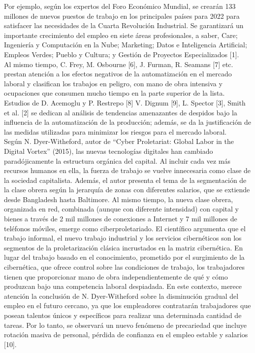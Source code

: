 Por ejemplo, según los expertos del Foro Económico Mundial, se crearán 133 millones de nuevos puestos de trabajo en los principales países para 2022 para satisfacer las necesidades de la Cuarta Revolución Industrial. Se garantizará un importante crecimiento del empleo en siete áreas profesionales, a saber, Care; Ingeniería y Computación en la Nube; Marketing; Datos e Inteligencia Artificial; Empleos Verdes; Pueblo y Cultura; y Gestión de Proyectos Especializados [1].\\

Al mismo tiempo, C. Frey, M. Osbourne [6], J. Furman, R. Seamans [7] etc. prestan atención a los efectos negativos de la automatización en el mercado laboral y clasifican los trabajos en peligro, con mano de obra intensiva y ocupaciones que consumen mucho tiempo en la parte superior de la lista. Estudios de D. Acemoglu y P. Restrepo [8] V. Dignum [9], L. Spector [3], Smith et al. [2] se dedican al análisis de tendencias amenazantes de despidos bajo la influencia de la automatización de la producción; además, se da la justificación de las medidas utilizadas para minimizar los riesgos para el mercado laboral.\\

Según N. Dyer-Witheford, autor de “Cyber Proletariat: Global Labor in the Digital Vortex” (2015), las nuevas tecnologías digitales han cambiado paradójicamente la estructura orgánica del capital. Al incluir cada vez más recursos humanos en ella, la fuerza de trabajo se vuelve innecesaria como clase de la sociedad capitalista. Además, el autor presenta el tema de la segmentación de la clase obrera según la jerarquía de zonas con diferentes salarios, que se extiende desde Bangladesh hasta Baltimore. Al mismo tiempo, la nueva clase obrera, organizada en red, combinada (aunque con diferente intensidad) con capital y bienes a través de 2 mil millones de conexiones a Internet y 7 mil millones de teléfonos móviles, emerge como ciberproletariado. El científico argumenta que el trabajo informal, el nuevo trabajo industrial y los servicios cibernéticos son los segmentos de la proletarización clásica incrustados en la matriz cibernética. En lugar del trabajo basado en el conocimiento, prometido por el surgimiento de la cibernética, que ofrece control sobre las condiciones de trabajo, los trabajadores tienen que proporcionar mano de obra independientemente de qué y cómo produzcan bajo una competencia laboral despiadada. En este contexto, merece atención la conclusión de N. Dyer-Witheford sobre la disminución gradual del empleo en el futuro cercano, ya que los empleadores contratarán trabajadores que posean talentos únicos y específicos para realizar una determinada cantidad de tareas. Por lo tanto, se observará un nuevo fenómeno de precariedad que incluye rotación masiva de personal, pérdida de confianza en el empleo estable y salarios [10].\\

